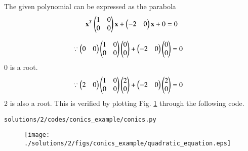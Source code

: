 The given polynomial can be expressed as the parabola 
\begin{align}
\mathbf{x}^T 
\begin{pmatrix}
1 & 0 \\
0 & 0
\end{pmatrix}
\mathbf{x} + 
\begin{pmatrix}
-2 & 0 
\end{pmatrix}
\mathbf{x} + 0 = 0 \label{eq:5.1.2_conics_main}
\end{align}


\begin{align}
\because \begin{pmatrix}0&0\end{pmatrix}
\begin{pmatrix}
1 & 0 \\
0 & 0
\end{pmatrix}
\begin{pmatrix}0\\0\end{pmatrix} &+ 
\begin{pmatrix}
-2 & 0 
\end{pmatrix}
\begin{pmatrix}0\\0\end{pmatrix}   = 0
\end{align}
0 is a root.
\begin{align}
\because \begin{pmatrix}2&0\end{pmatrix}
\begin{pmatrix}
1 & 0 \\
0 & 0
\end{pmatrix}
\begin{pmatrix}2\\0\end{pmatrix} &+ 
\begin{pmatrix}
-2 & 0 
\end{pmatrix}
\begin{pmatrix}2\\0\end{pmatrix}  =  0
\end{align}
2 is also a root.  This is verified by plotting Fig. \ref{fig:5.1.2_quadeq_conics_example}
through the following code.
\begin{lstlisting}
solutions/2/codes/conics_example/conics.py
\end{lstlisting}

 \begin{figure}[!ht]
\centering
\texttt{[image: ./solutions/2/figs/conics\_example/quadratic\_equation.eps]}
\caption{}
\label{fig:5.1.2_quadeq_conics_example}
\end{figure} 
